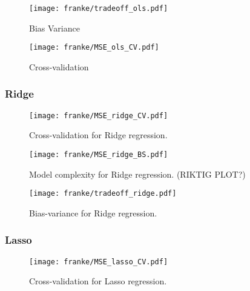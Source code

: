             

            \begin{figure}
                \texttt{[image: franke/tradeoff\_ols.pdf]}
                \caption{Bias Variance}
                \label{fig:bias_variance_ols}
            \end{figure}


            \begin{figure}
                \texttt{[image: franke/MSE\_ols\_CV.pdf]}
                \caption{Cross-validation}
                \label{fig:cross-validation_ols}
            \end{figure}



        

        \subsubsection{Ridge}\label{sec:rigdeanalysis}

        \begin{figure}
            \texttt{[image: franke/MSE\_ridge\_CV.pdf]}
            \caption{Cross-validation for Ridge regression.}
            \label{fig:cross-validation_ridge}
        \end{figure}

        \begin{figure}
            \texttt{[image: franke/MSE\_ridge\_BS.pdf]}
            \caption{Model complexity for Ridge regression. (RIKTIG PLOT?)}
            \label{fig:model_complexity_ridge}
        \end{figure}

        \begin{figure}
            \texttt{[image: franke/tradeoff\_ridge.pdf]}
            \caption{Bias-variance for Ridge regression.}
            \label{fig:bias_variance_ridge}
        \end{figure}

        \subsubsection{Lasso}\label{sec:lassoanalysis}

        \begin{figure}
            \texttt{[image: franke/MSE\_lasso\_CV.pdf]}
            \caption{Cross-validation for Lasso regression.}
            \label{fig:cross-validation_lasso}
        \end{figure}

